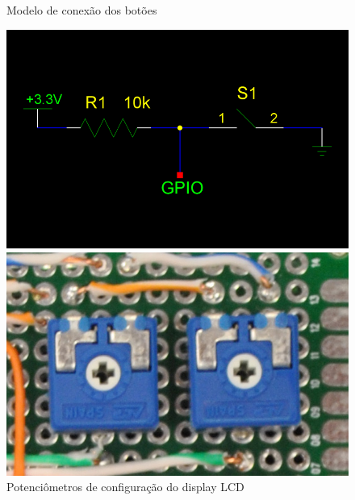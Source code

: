 \documentclass[
		12pt,				%
		openright,			%
		oneside,			%
		a4paper,			%
		chapter=TITLE,		%
		english,			%
		brazil				%
	]{abntex2}
\begin{document}
\begin{figure}[htb]
	\centering
 	\begin{minipage}{0.45\textwidth}
		\centering
		\caption{\label{fig:push-btn-sketch}Modelo de conexão dos botões}
		\includegraphics[width=1\textwidth]{img/push-btn-sketch.png}
	\end{minipage}
	\hfill
	\begin{minipage}{0.45\textwidth}
		\centering
		\caption{\label{fig:potentiometer}Potenciômetros de configuração do display LCD}
		\includegraphics[width=1\textwidth]{img/potentiometer.jpg}
	\end{minipage}
\end{figure}
\end{document}
